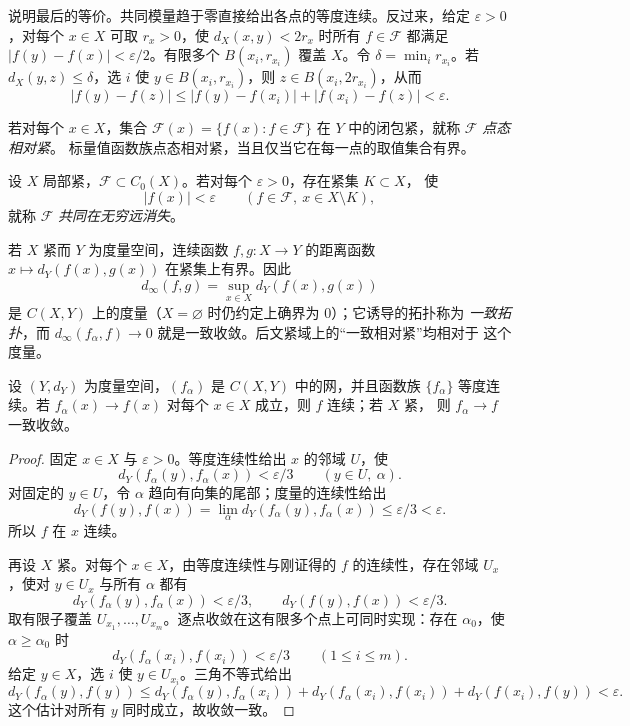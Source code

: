 说明最后的等价。共同模量趋于零直接给出各点的等度连续。反过来，给定 $\varepsilon>0$，对每个
$x\in X$ 可取 $r_x>0$，使 $d_X(x,y)<2r_x$ 时所有 $f\in\mathcal F$ 都满足
$|f(y)-f(x)|<\varepsilon/2$。有限多个 $B(x_i,r_{x_i})$ 覆盖 $X$。令
$\delta=\min_i r_{x_i}$。若 $d_X(y,z)\le\delta$，选 $i$ 使 $y\in B(x_i,r_{x_i})$，则
$z\in B(x_i,2r_{x_i})$，从而
\[
 |f(y)-f(z)|
 \le |f(y)-f(x_i)|+|f(x_i)-f(z)|<\varepsilon.
\]

\begin{definition}[点态相对紧]\label{def:1-3-2-2}
若对每个 $x\in X$，集合
$\mathcal F(x)=\{f(x):f\in\mathcal F\}$ 在 $Y$ 中的闭包紧，就称 $\mathcal F$ \emph{点态相对紧}。
标量值函数族点态相对紧，当且仅当它在每一点的取值集合有界。
\end{definition}

\begin{definition}[共同在无穷远消失]\label{def:1-3-2-3}
设 $X$ 局部紧，$\mathcal F\subset C_0(X)$。若对每个 $\varepsilon>0$，存在紧集 $K\subset X$，
使
\[
 |f(x)|<\varepsilon
 \qquad(f\in\mathcal F,\ x\in X\setminus K),
\]
就称 $\mathcal F$ \emph{共同在无穷远消失}。
\end{definition}

若 $X$ 紧而 $Y$ 为度量空间，连续函数 $f,g:X\to Y$ 的距离函数
$x\mapsto d_Y(f(x),g(x))$ 在紧集上有界。因此
\[
  d_\infty(f,g)=\sup_{x\in X}d_Y(f(x),g(x))
\]
是 $C(X,Y)$ 上的度量（$X=\varnothing$ 时仍约定上确界为 $0$）；它诱导的拓扑称为
\emph{一致拓扑}，而 $d_\infty(f_\alpha,f)\to0$ 就是一致收敛。后文紧域上的“一致相对紧”均相对于
这个度量。

\begin{proposition}[等度连续极限升级]\label{proposition:1-3-2-1}
设 $(Y,d_Y)$ 为度量空间，$(f_\alpha)$ 是 $C(X,Y)$ 中的网，并且函数族
$\{f_\alpha\}$ 等度连续。若 $f_\alpha(x)\to f(x)$ 对每个 $x\in X$ 成立，则 $f$ 连续；若 $X$ 紧，
则 $f_\alpha\to f$ 一致收敛。
\end{proposition}

\begin{proof}
固定 $x\in X$ 与 $\varepsilon>0$。等度连续性给出 $x$ 的邻域 $U$，使
\[
 d_Y(f_\alpha(y),f_\alpha(x))<\varepsilon/3
 \qquad(y\in U,\ \alpha).
\]
对固定的 $y\in U$，令 $\alpha$ 趋向有向集的尾部；度量的连续性给出
\[
 d_Y(f(y),f(x))
 =\lim_\alpha d_Y(f_\alpha(y),f_\alpha(x))
 \le\varepsilon/3<\varepsilon.
\]
所以 $f$ 在 $x$ 连续。

再设 $X$ 紧。对每个 $x\in X$，由等度连续性与刚证得的 $f$ 的连续性，存在邻域 $U_x$，使对
$y\in U_x$ 与所有 $\alpha$ 都有
\[
 d_Y(f_\alpha(y),f_\alpha(x))<\varepsilon/3,
 \qquad
 d_Y(f(y),f(x))<\varepsilon/3.
\]
取有限子覆盖 $U_{x_1},\ldots,U_{x_m}$。逐点收敛在这有限多个点上可同时实现：存在 $\alpha_0$，使
$\alpha\ge\alpha_0$ 时
\[
 d_Y(f_\alpha(x_i),f(x_i))<\varepsilon/3
 \qquad(1\le i\le m).
\]
给定 $y\in X$，选 $i$ 使 $y\in U_{x_i}$。三角不等式给出
\[
 d_Y(f_\alpha(y),f(y))
 \le d_Y(f_\alpha(y),f_\alpha(x_i))
   +d_Y(f_\alpha(x_i),f(x_i))
   +d_Y(f(x_i),f(y))
 <\varepsilon.
\]
这个估计对所有 $y$ 同时成立，故收敛一致。
\end{proof}

